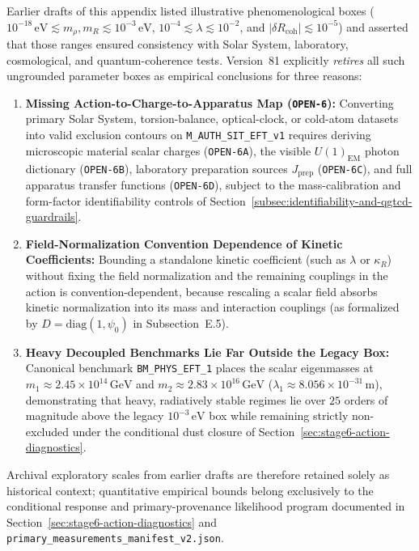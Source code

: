 Earlier drafts of this appendix listed illustrative phenomenological boxes ($10^{-18}\,\mathrm{eV} \lesssim m_\rho, m_R \lesssim 10^{-3}\,\mathrm{eV}$, $10^{-4} \lesssim \lambda \lesssim 10^{-2}$, and $|\delta R_{\mathrm{coh}}| \lesssim 10^{-5}$) and asserted that those ranges ensured consistency with Solar System, laboratory, cosmological, and quantum-coherence tests. Version~81 explicitly \emph{retires} all such ungrounded parameter boxes as empirical conclusions for three reasons:
\begin{enumerate}[leftmargin=2em]
  \item \textbf{Missing Action-to-Charge-to-Apparatus Map (\texttt{OPEN-6}):} Converting primary Solar System, torsion-balance, optical-clock, or cold-atom datasets into valid exclusion contours on \texttt{M\_AUTH\_SIT\_EFT\_v1} requires deriving microscopic material scalar charges (\texttt{OPEN-6A}), the visible $U(1)_{\mathrm{EM}}$ photon dictionary (\texttt{OPEN-6B}), laboratory preparation sources $J_{\mathrm{prep}}$ (\texttt{OPEN-6C}), and full apparatus transfer functions (\texttt{OPEN-6D}), subject to the mass-calibration and form-factor identifiability controls of Section~\ref{subsec:identifiability-and-qgtcd-guardrails}.
  \item \textbf{Field-Normalization Convention Dependence of Kinetic Coefficients:} Bounding a standalone kinetic coefficient (such as $\lambda$ or $\kappa_R$) without fixing the field normalization and the remaining couplings in the action is convention-dependent, because rescaling a scalar field absorbs kinetic normalization into its mass and interaction couplings (as formalized by $D = \mathrm{diag}(1, \psi_0)$ in Subsection~E.5).
  \item \textbf{Heavy Decoupled Benchmarks Lie Far Outside the Legacy Box:} Canonical benchmark \texttt{BM\_PHYS\_EFT\_1} places the scalar eigenmasses at $m_1 \approx 2.45\times 10^{14}\,\mathrm{GeV}$ and $m_2 \approx 2.83\times 10^{16}\,\mathrm{GeV}$ ($\lambda_1 \approx 8.056\times 10^{-31}\,\mathrm{m}$), demonstrating that heavy, radiatively stable regimes lie over $25$ orders of magnitude above the legacy $10^{-3}\,\mathrm{eV}$ box while remaining strictly non-excluded under the conditional dust closure of Section~\ref{sec:stage6-action-diagnostics}.
\end{enumerate}

Archival exploratory scales from earlier drafts are therefore retained solely as historical context; quantitative empirical bounds belong exclusively to the conditional response and primary-provenance likelihood program documented in Section~\ref{sec:stage6-action-diagnostics} and \texttt{primary\_measurements\_manifest\_v2.json}.

